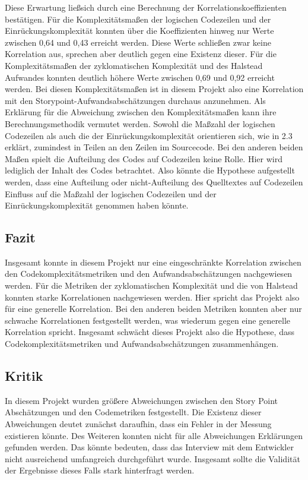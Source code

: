 Diese Erwartung lie\ss  sich durch eine Berechnung der
Korrelationskoeffizienten bestätigen. Für die Komplexitätsma\ss en der
logischen Codezeilen und der Einrückungskomplexität konnten über die
Koeffizienten hinweg nur Werte zwischen 0,64 und 0,43 erreicht werden.
Diese Werte schlie\ss en zwar keine Korrelation aus, sprechen aber deutlich
gegen eine Existenz dieser. Für die Komplexitätsma\ss en der zyklomatischen
Komplexität und des Halstead Aufwandes konnten deutlich höhere Werte
zwischen 0,69 und 0,92 erreicht werden. Bei diesen Komplexitätsma\ss en ist
in diesem Projekt also eine Korrelation mit den
Storypoint-Aufwandsabschätzungen durchaus anzunehmen. Als Erklärung für
die Abweichung zwischen den Komplexitätsma\ss en kann ihre
Berechnungsmethodik vermutet werden. Sowohl die Ma\ss zahl der logischen
Codezeilen als auch die der Einrückungskomplexität orientieren sich, wie
in 2.3 erklärt, zumindest in Teilen an den Zeilen im Sourcecode. Bei den
anderen beiden Ma\ss en spielt die Aufteilung des Codes auf Codezeilen
keine Rolle. Hier wird lediglich der Inhalt des Codes betrachtet. Also
könnte die Hypothese aufgestellt werden, dass eine Aufteilung oder
nicht-Aufteilung des Quelltextes auf Codezeilen Einfluss auf die Ma\ss zahl
der logischen Codezeilen und der Einrückungskomplexität genommen haben
könnte.

\subsection{Fazit}\label{ingrid-fazit}

Insgesamt konnte in diesem Projekt nur eine eingeschränkte Korrelation
zwischen den Codekomplexitätsmetriken und den Aufwandsabschätzungen
nachgewiesen werden. Für die Metriken der zyklomatischen Komplexität und
die von Halstead konnten starke Korrelationen nachgewiesen werden. Hier
spricht das Projekt also für eine generelle Korrelation. Bei den anderen
beiden Metriken konnten aber nur schwache Korrelationen festgestellt
werden, was wiederum gegen eine generelle Korrelation spricht. Insgesamt
schwächt dieses Projekt also die Hypothese, dass
Codekomplexitätsmetriken und Aufwandsabschätzungen zusammenhängen.

\subsection{Kritik}\label{ingrid-kritik}

In diesem Projekt wurden grö\ss ere Abweichungen zwischen den Story Point
Abschätzungen und den Codemetriken festgestellt. Die Existenz dieser
Abweichungen deutet zunächst daraufhin, dass ein Fehler in der Messung
existieren könnte. Des Weiteren konnten nicht für alle Abweichungen
Erklärungen gefunden werden. Das könnte bedeuten, dass das Interview mit
dem Entwickler nicht ausreichend umfangreich durchgeführt wurde.
Insgesamt sollte die Validität der Ergebnisse dieses Falls stark
hinterfragt werden.

